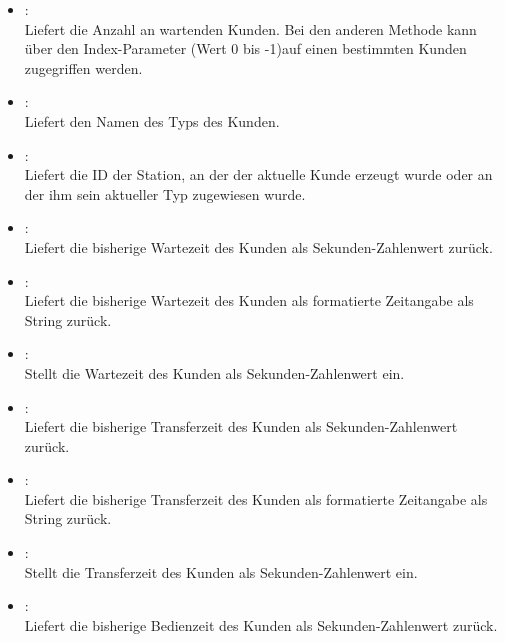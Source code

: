 \begin{itemize}

\item
{}:\\
Liefert die Anzahl an wartenden Kunden. Bei den anderen Methode kann
über den Index-Parameter (Wert 0 bis -1)auf einen bestimmten
Kunden zugegriffen werden.

\item
{}:\\
Liefert den Namen des Typs des Kunden.

\item
{}:\\
Liefert die ID der Station, an der der aktuelle Kunde erzeugt wurde oder an der ihm sein aktueller Typ zugewiesen wurde.

\item
{}:\\
Liefert die bisherige Wartezeit des Kunden als Sekunden-Zahlenwert zurück.

\item
{}:\\
Liefert die bisherige Wartezeit des Kunden als formatierte Zeitangabe als String zurück.

\item
{}:\\
Stellt die Wartezeit des Kunden als Sekunden-Zahlenwert ein.

\item
{}:\\
Liefert die bisherige Transferzeit des Kunden als Sekunden-Zahlenwert zurück.

\item
{}:\\
Liefert die bisherige Transferzeit des Kunden als formatierte Zeitangabe als String zurück.

\item
{}:\\
Stellt die Transferzeit des Kunden als Sekunden-Zahlenwert ein.

\item
{}:\\
Liefert die bisherige Bedienzeit des Kunden als Sekunden-Zahlenwert zurück.


\end{itemize}
